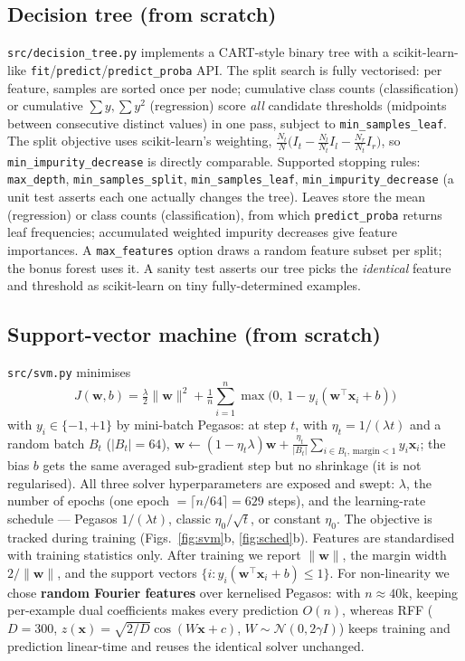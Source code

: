 \documentclass[10pt,twocolumn,a4paper]{article}
\begin{document}
\subsection{Decision tree (from scratch)}
\texttt{src/decision\_tree.py} implements a CART-style binary tree with a
scikit-learn-like \texttt{fit}/\texttt{predict}/\texttt{predict\_proba}
API. The split search is fully vectorised: per feature, samples are
sorted once per node; cumulative class counts (classification) or
cumulative $\sum y, \sum y^2$ (regression) score \emph{all} candidate
thresholds (midpoints between consecutive distinct values) in one pass,
subject to \texttt{min\_samples\_leaf}. The split objective uses
scikit-learn's weighting,
$\frac{N_t}{N}\big(I_t - \frac{N_l}{N_t}I_l - \frac{N_r}{N_t}I_r\big)$,
so \texttt{min\_impurity\_decrease} is directly comparable. Supported
stopping rules: \texttt{max\_depth}, \texttt{min\_samples\_split},
\texttt{min\_samples\_leaf}, \texttt{min\_impurity\_decrease} (a unit
test asserts each one actually changes the tree). Leaves store the mean
(regression) or class counts (classification), from which
\texttt{predict\_proba} returns leaf frequencies; accumulated weighted
impurity decreases give feature importances. A \texttt{max\_features}
option draws a random feature subset per split; the bonus forest uses it.
A sanity test asserts our tree picks the \emph{identical} feature and
threshold as scikit-learn on tiny fully-determined examples.

\subsection{Support-vector machine (from scratch)}
\texttt{src/svm.py} minimises
\begin{equation}
  J(\mathbf{w},b)=\tfrac{\lambda}{2}\lVert\mathbf{w}\rVert^{2}
  +\tfrac{1}{n}\sum_{i=1}^{n}\max\!\big(0,\,1-y_i(\mathbf{w}^{\top}\mathbf{x}_i+b)\big)
\end{equation}
with $y_i \in \{-1,+1\}$ by mini-batch Pegasos: at step $t$, with
$\eta_t = 1/(\lambda t)$ and a random batch $B_t$ ($|B_t|=64$),
$\mathbf{w} \leftarrow (1-\eta_t\lambda)\mathbf{w} + \frac{\eta_t}{|B_t|}
\sum_{i \in B_t, \,\text{margin}<1} y_i \mathbf{x}_i$; the bias $b$ gets
the same averaged sub-gradient step but no shrinkage (it is not
regularised). All three solver hyperparameters are exposed and swept:
$\lambda$, the number of epochs (one epoch $= \lceil n/64\rceil = 629$
steps), and the learning-rate schedule --- Pegasos $1/(\lambda t)$,
classic $\eta_0/\sqrt{t}$, or constant $\eta_0$. The objective is tracked
during training (Figs.~\ref{fig:svm}b, \ref{fig:sched}b). Features are
standardised with training statistics only. After training we report $\lVert\mathbf{w}\rVert$, the margin width
$2/\lVert\mathbf{w}\rVert$, and the support vectors
$\{i : y_i(\mathbf{w}^\top\mathbf{x}_i+b)\le 1\}$. For non-linearity we
chose \textbf{random Fourier features} over kernelised Pegasos: with
$n\approx 40$k, keeping per-example dual coefficients makes every
prediction $O(n)$, whereas RFF ($D=300$,
$z(\mathbf{x})=\sqrt{2/D}\cos(W\mathbf{x}+c)$, $W \sim
\mathcal{N}(0, 2\gamma I)$) keeps training and prediction linear-time and
reuses the identical solver unchanged.
\end{document}

